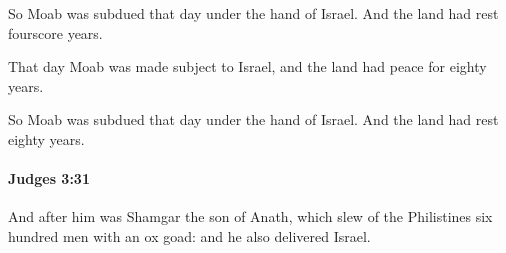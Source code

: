 			\begin{versebox}
					\item[BHS] 
					\item[ASV] So Moab was subdued that day under the hand of Israel. And the land had rest fourscore years.
					\item[NIV] That day Moab was made subject to Israel, and the land had peace for eighty years.
					\item[NRSV] So Moab was subdued that day under the hand of Israel. And the land had rest eighty years.
			\end{versebox}

		\paragraph{Judges 3:31} %
			\label{JUDGES-3-31}

			And after him was Shamgar the son of Anath, which slew of the Philistines six hundred men with an ox goad: and he also delivered Israel.

